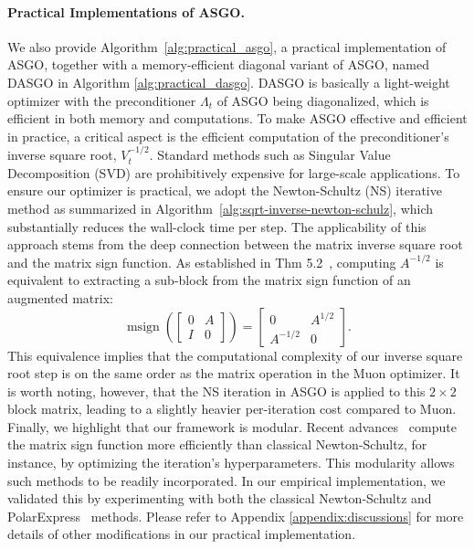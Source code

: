 \documentclass{article}
\theoremstyle{remark}
\begin{document}
\paragraph{Practical Implementations of ASGO.} We also provide Algorithm~\ref{alg:practical_asgo}, a practical implementation of ASGO, together with a memory-efficient diagonal variant of ASGO, named DASGO in Algorithm \ref{alg:practical_dasgo}. 
DASGO is basically a light-weight optimizer with the preconditioner $\Lambda_t$ of ASGO being diagonalized, which is efficient in both memory and computations. 
To make ASGO effective and efficient in practice, a critical aspect is the efficient computation of the preconditioner's inverse square root, $V_t^{-1/2}$. Standard methods such as Singular Value Decomposition (SVD) are prohibitively expensive for large-scale applications. To ensure our optimizer is practical, we adopt the Newton-Schultz (NS) iterative method as summarized in Algorithm~\ref{alg:sqrt-inverse-newton-schulz}, which substantially reduces the wall-clock time per step. The applicability of this approach stems from the deep connection between the matrix inverse square root and the matrix sign function. As established in Thm 5.2~\citep{high:FM}, computing $A^{-1/2}$ is equivalent to extracting a sub-block from the matrix sign function of an augmented matrix:
\[
\operatorname{msign}\left(\left[\begin{array}{cc}
0 & A \\
I & 0
\end{array}\right]\right)=\left[\begin{array}{cc}
0 & A^{1/2} \\
A^{-1/2} & 0
\end{array}\right].
\]
This equivalence implies that the computational complexity of our inverse square root step is on the same order as the matrix operation in the Muon optimizer. It is worth noting, however, that the NS iteration in ASGO is applied to this $2 \times 2$ block matrix, leading to a slightly heavier per-iteration cost compared to Muon. Finally, we highlight that our framework is modular. Recent advances~\citep{amsel2025polar,grishina2025accelerating} compute the matrix sign function more efficiently than classical Newton-Schultz, for instance, by optimizing the iteration's hyperparameters.
This modularity allows such methods to be readily incorporated.
In our empirical implementation, we validated this by experimenting with both the classical Newton-Schultz and PolarExpress~\citep{amsel2025polar} methods.
Please refer to Appendix \ref{appendix:discussions} for more details of other modifications in our practical implementation.
\end{document}
